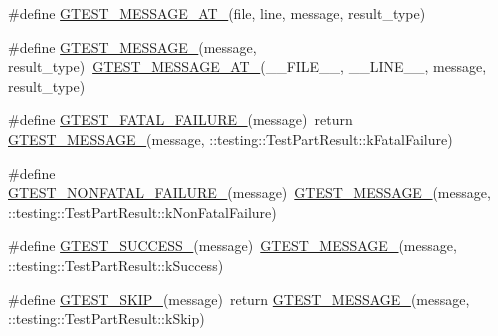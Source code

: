 \begin{DoxyCompactItemize}
\item 
\#define \mbox{\hyperlink{_obj__test_2lib_2googletest-master_2googletest_2include_2gtest_2internal_2gtest-internal_8h_a8d70025c45a47a493780746dfd66d565}{G\+T\+E\+S\+T\+\_\+\+M\+E\+S\+S\+A\+G\+E\+\_\+\+A\+T\+\_\+}}(file,  line,  message,  result\+\_\+type)
\item 
\#define \mbox{\hyperlink{_obj__test_2lib_2googletest-master_2googletest_2include_2gtest_2internal_2gtest-internal_8h_a94c73d5368ec946bc354d0992ad00810}{G\+T\+E\+S\+T\+\_\+\+M\+E\+S\+S\+A\+G\+E\+\_\+}}(message,  result\+\_\+type)~\mbox{\hyperlink{_obj__test_2lib_2googletest-release-1_88_81_2googletest_2include_2gtest_2internal_2gtest-internal_8h_a8d70025c45a47a493780746dfd66d565}{G\+T\+E\+S\+T\+\_\+\+M\+E\+S\+S\+A\+G\+E\+\_\+\+A\+T\+\_\+}}(\+\_\+\+\_\+\+F\+I\+L\+E\+\_\+\+\_\+, \+\_\+\+\_\+\+L\+I\+N\+E\+\_\+\+\_\+, message, result\+\_\+type)
\item 
\#define \mbox{\hyperlink{_obj__test_2lib_2googletest-master_2googletest_2include_2gtest_2internal_2gtest-internal_8h_a0f9a4c3ea82cc7bf4478eaffdc168358}{G\+T\+E\+S\+T\+\_\+\+F\+A\+T\+A\+L\+\_\+\+F\+A\+I\+L\+U\+R\+E\+\_\+}}(message)~return \mbox{\hyperlink{_obj__test_2lib_2googletest-release-1_88_81_2googletest_2include_2gtest_2internal_2gtest-internal_8h_a94c73d5368ec946bc354d0992ad00810}{G\+T\+E\+S\+T\+\_\+\+M\+E\+S\+S\+A\+G\+E\+\_\+}}(message, \+::testing\+::\+Test\+Part\+Result\+::k\+Fatal\+Failure)
\item 
\#define \mbox{\hyperlink{_obj__test_2lib_2googletest-master_2googletest_2include_2gtest_2internal_2gtest-internal_8h_a6cb7482cfa03661a91c698eb5895f642}{G\+T\+E\+S\+T\+\_\+\+N\+O\+N\+F\+A\+T\+A\+L\+\_\+\+F\+A\+I\+L\+U\+R\+E\+\_\+}}(message)~\mbox{\hyperlink{_obj__test_2lib_2googletest-release-1_88_81_2googletest_2include_2gtest_2internal_2gtest-internal_8h_a94c73d5368ec946bc354d0992ad00810}{G\+T\+E\+S\+T\+\_\+\+M\+E\+S\+S\+A\+G\+E\+\_\+}}(message, \+::testing\+::\+Test\+Part\+Result\+::k\+Non\+Fatal\+Failure)
\item 
\#define \mbox{\hyperlink{_obj__test_2lib_2googletest-master_2googletest_2include_2gtest_2internal_2gtest-internal_8h_abe012b550eb3807e8c49f7e161bd1567}{G\+T\+E\+S\+T\+\_\+\+S\+U\+C\+C\+E\+S\+S\+\_\+}}(message)~\mbox{\hyperlink{_obj__test_2lib_2googletest-release-1_88_81_2googletest_2include_2gtest_2internal_2gtest-internal_8h_a94c73d5368ec946bc354d0992ad00810}{G\+T\+E\+S\+T\+\_\+\+M\+E\+S\+S\+A\+G\+E\+\_\+}}(message, \+::testing\+::\+Test\+Part\+Result\+::k\+Success)
\item 
\#define \mbox{\hyperlink{_obj__test_2lib_2googletest-master_2googletest_2include_2gtest_2internal_2gtest-internal_8h_ab75ed7a6cd9e466944ce680c1c07ab47}{G\+T\+E\+S\+T\+\_\+\+S\+K\+I\+P\+\_\+}}(message)~return \mbox{\hyperlink{_obj__test_2lib_2googletest-release-1_88_81_2googletest_2include_2gtest_2internal_2gtest-internal_8h_a94c73d5368ec946bc354d0992ad00810}{G\+T\+E\+S\+T\+\_\+\+M\+E\+S\+S\+A\+G\+E\+\_\+}}(message, \+::testing\+::\+Test\+Part\+Result\+::k\+Skip)

\end{DoxyCompactItemize}
